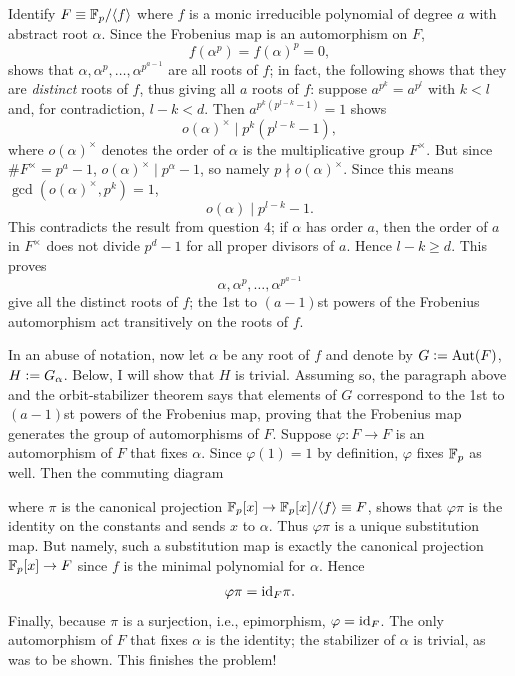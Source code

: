 \documentclass[12pt]{article}
\begin{document}
\noindent \dotfill 

Identify $F \equiv \F_p / \<f\>$ where $f$ is a monic irreducible polynomial of degree $a$ with abstract root $\alpha$. 
Since the Frobenius map is an automorphism on $F$,  
$$f(\alpha^p) = f(\alpha)^p = 0,$$ 
shows that $\alpha, \alpha^p, \ldots, \alpha^{p^{a - 1}}$ are all roots of $f$;
in fact, the following shows that they are \textit{distinct} roots of $f$, thus giving all $a$ roots of $f$: 
suppose $a^{p^k} = a^{p^l}$ with $k < l$ and, for contradiction, $l - k < d$. 
Then $a^{p^k(p^{l - k} - 1)} = 1$ shows 
$$o(\alpha)^{\times} \mid p^k(p^{l - k} - 1),$$
where $o(\alpha)^{\times}$ denotes the order of $\alpha$ is the multiplicative group $F^{\times}$. 
But since $\#F^{\times} = p^a - 1$, $o(\alpha)^{\times} \mid p^{\alpha} - 1$, so namely $p \nmid o(\alpha)^{\times}$. 
Since this means $\gcd(o(\alpha)^{\times}, p^k) = 1$, 
$$o(\alpha) \mid p^{l - k} - 1.$$ 
This contradicts the result from question 4; 
if $\alpha$ has order $a$, then the order of $a$ in $F^{\times}$ does not divide $p^d - 1$ for all proper divisors of $a$. 
Hence $l - k \geq d$.
This proves 
$$\alpha, \alpha^p, \ldots, \alpha^{p^{a - 1}}$$ 
give all the distinct roots of $f$; 
the 1st to $(a - 1)$st powers of the Frobenius automorphism act transitively on the roots of $f$. 

In an abuse of notation, now let $\alpha$ be any root of $f$ and denote by $G \vcentcolon= \text{Aut}(F)$, $H \vcentcolon= G_{\alpha}$. 
Below, I will show that $H$ is trivial. 
Assuming so, the paragraph above and the orbit-stabilizer theorem says that elements of $G$ correspond to the 1st to $(a - 1)$st powers of the Frobenius map, proving that the Frobenius map generates the group of automorphisms of $F$. 
Suppose $\varphi:F \rightarrow F$ is an automorphism of $F$ that fixes $\alpha$. 
Since $\varphi(1) = 1$ by definition, $\varphi$ fixes $\mathbb{F}_p$ as well. 
Then the commuting diagram 
\begin{center}
\end{center}
where $\pi$ is the canonical projection $\F_p[x] \rightarrow \F_p[x] / \<f\> \equiv F$, shows that $\varphi \pi$ is the identity on the constants and sends $x$ to $\alpha$. 
Thus $\varphi \pi$ is a unique substitution map. 
But namely, such a substitution map is exactly the canonical projection $\mathbb{F}_p[x] \rightarrow F$ since $f$ is the minimal polynomial for $\alpha$. 
Hence 
$$\varphi \pi = \text{id}_{F} \pi.$$
Finally, because $\pi$ is a surjection, i.e., epimorphism, $\varphi = \text{id}_{F}$. 
The only automorphism of $F$ that fixes $\alpha$ is the identity; 
the stabilizer of $\alpha$ is trivial, as was to be shown.  
This finishes the problem!
\end{document}
